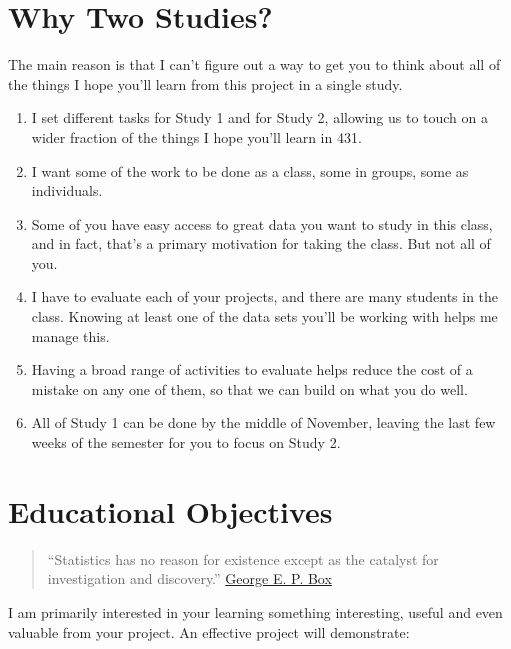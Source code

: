 \documentclass[]{book}
\providecommand{\tightlist}{%
  \setlength{\itemsep}{0pt}\setlength{\parskip}{0pt}}
\theoremstyle{definition}
\theoremstyle{definition}
\theoremstyle{definition}
\theoremstyle{remark}
\begin{document}
\hypertarget{why-two-studies}{%
\section{Why Two Studies?}\label{why-two-studies}}

The main reason is that I can't figure out a way to get you to think
about all of the things I hope you'll learn from this project in a
single study.

\begin{enumerate}
\def\labelenumi{\arabic{enumi}.}
\tightlist
\item
  I set different tasks for Study 1 and for Study 2, allowing us to
  touch on a wider fraction of the things I hope you'll learn in 431.
\item
  I want some of the work to be done as a class, some in groups, some as
  individuals.
\item
  Some of you have easy access to great data you want to study in this
  class, and in fact, that's a primary motivation for taking the class.
  But not all of you.
\item
  I have to evaluate each of your projects, and there are many students
  in the class. Knowing at least one of the data sets you'll be working
  with helps me manage this.
\item
  Having a broad range of activities to evaluate helps reduce the cost
  of a mistake on any one of them, so that we can build on what you do
  well.
\item
  All of Study 1 can be done by the middle of November, leaving the last
  few weeks of the semester for you to focus on Study 2.
\end{enumerate}

\hypertarget{educational-objectives}{%
\section{Educational Objectives}\label{educational-objectives}}

\begin{quote}
``Statistics has no reason for existence except as the catalyst for
investigation and discovery.''
\href{https://en.wikipedia.org/wiki/George_E._P._Box}{George E. P. Box}
\end{quote}

I am primarily interested in your learning something interesting, useful
and even valuable from your project. An effective project will
demonstrate:
\end{document}
